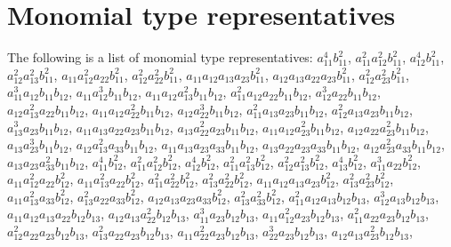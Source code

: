 \documentclass{article}
\begin{document}
\section{Monomial type representatives}
The following is a list of monomial type representatives: $ a_{11}^{4} b_{11}^{2} $,
$ a_{11}^{2} a_{12}^{2} b_{11}^{2} $,
$ a_{12}^{4} b_{11}^{2} $,
$ a_{12}^{2} a_{13}^{2} b_{11}^{2} $,
$ a_{11} a_{12}^{2} a_{22} b_{11}^{2} $,
$ a_{12}^{2} a_{22}^{2} b_{11}^{2} $,
$ a_{11} a_{12} a_{13} a_{23} b_{11}^{2} $,
$ a_{12} a_{13} a_{22} a_{23} b_{11}^{2} $,
$ a_{12}^{2} a_{23}^{2} b_{11}^{2} $,
$ a_{11}^{3} a_{12} b_{11} b_{12} $,
$ a_{11} a_{12}^{3} b_{11} b_{12} $,
$ a_{11} a_{12} a_{13}^{2} b_{11} b_{12} $,
$ a_{11}^{2} a_{12} a_{22} b_{11} b_{12} $,
$ a_{12}^{3} a_{22} b_{11} b_{12} $,
$ a_{12} a_{13}^{2} a_{22} b_{11} b_{12} $,
$ a_{11} a_{12} a_{22}^{2} b_{11} b_{12} $,
$ a_{12} a_{22}^{3} b_{11} b_{12} $,
$ a_{11}^{2} a_{13} a_{23} b_{11} b_{12} $,
$ a_{12}^{2} a_{13} a_{23} b_{11} b_{12} $,
$ a_{13}^{3} a_{23} b_{11} b_{12} $,
$ a_{11} a_{13} a_{22} a_{23} b_{11} b_{12} $,
$ a_{13} a_{22}^{2} a_{23} b_{11} b_{12} $,
$ a_{11} a_{12} a_{23}^{2} b_{11} b_{12} $,
$ a_{12} a_{22} a_{23}^{2} b_{11} b_{12} $,
$ a_{13} a_{23}^{3} b_{11} b_{12} $,
$ a_{12} a_{13}^{2} a_{33} b_{11} b_{12} $,
$ a_{11} a_{13} a_{23} a_{33} b_{11} b_{12} $,
$ a_{13} a_{22} a_{23} a_{33} b_{11} b_{12} $,
$ a_{12} a_{23}^{2} a_{33} b_{11} b_{12} $,
$ a_{13} a_{23} a_{33}^{2} b_{11} b_{12} $,
$ a_{11}^{4} b_{12}^{2} $,
$ a_{11}^{2} a_{12}^{2} b_{12}^{2} $,
$ a_{12}^{4} b_{12}^{2} $,
$ a_{11}^{2} a_{13}^{2} b_{12}^{2} $,
$ a_{12}^{2} a_{13}^{2} b_{12}^{2} $,
$ a_{13}^{4} b_{12}^{2} $,
$ a_{11}^{3} a_{22} b_{12}^{2} $,
$ a_{11} a_{12}^{2} a_{22} b_{12}^{2} $,
$ a_{11} a_{13}^{2} a_{22} b_{12}^{2} $,
$ a_{11}^{2} a_{22}^{2} b_{12}^{2} $,
$ a_{13}^{2} a_{22}^{2} b_{12}^{2} $,
$ a_{11} a_{12} a_{13} a_{23} b_{12}^{2} $,
$ a_{13}^{2} a_{23}^{2} b_{12}^{2} $,
$ a_{11} a_{13}^{2} a_{33} b_{12}^{2} $,
$ a_{13}^{2} a_{22} a_{33} b_{12}^{2} $,
$ a_{12} a_{13} a_{23} a_{33} b_{12}^{2} $,
$ a_{13}^{2} a_{33}^{2} b_{12}^{2} $,
$ a_{11}^{2} a_{12} a_{13} b_{12} b_{13} $,
$ a_{12}^{3} a_{13} b_{12} b_{13} $,
$ a_{11} a_{12} a_{13} a_{22} b_{12} b_{13} $,
$ a_{12} a_{13} a_{22}^{2} b_{12} b_{13} $,
$ a_{11}^{3} a_{23} b_{12} b_{13} $,
$ a_{11} a_{12}^{2} a_{23} b_{12} b_{13} $,
$ a_{11}^{2} a_{22} a_{23} b_{12} b_{13} $,
$ a_{12}^{2} a_{22} a_{23} b_{12} b_{13} $,
$ a_{13}^{2} a_{22} a_{23} b_{12} b_{13} $,
$ a_{11} a_{22}^{2} a_{23} b_{12} b_{13} $,
$ a_{22}^{3} a_{23} b_{12} b_{13} $,
$ a_{12} a_{13} a_{23}^{2} b_{12} b_{13} $,
\end{document}
